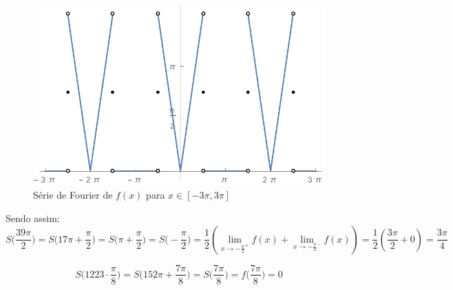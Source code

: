 \documentclass[12pt,a4paper]{article}
\begin{document}
\begin{itemize}
\begin{figure}[H]
	\centering
	\includegraphics[scale=0.7]{Fourier2.pdf}  
	\caption{Série de Fourier de $f(x)$ para $x \in [-3\pi, 3\pi]$}
	\label{fig:figura2}
\end{figure}

Sendo assim:
$$ S\Big(\frac{39 \pi}{2}\Big) = S\Big(17\pi + \frac{\pi}{2}\Big) = S\Big(\pi + \frac{\pi}{2}\Big) = S\Big(- \frac{\pi}{2}\Big) = \frac{1}{2} ( \lim_{x \rightarrow - \frac{\pi}{2}^+ } f(x) + \lim_{x \rightarrow - \frac{\pi}{2}^- } f(x) ) = \frac{1}{2} ( \frac{3\pi}{2} + 0) = \frac{3\pi}{4} $$

$$ S\Big(1223 \cdot \frac{\pi}{8}\Big) = S\Big(152\pi + \frac{7 \pi}{8}\Big) = S\Big(\frac{7\pi}{8}\Big) = f\Big(\frac{7\pi}{8}\Big) = 0 $$

\end{itemize}
\end{document}
